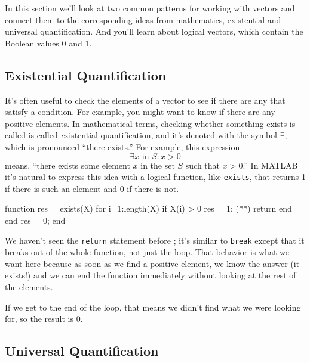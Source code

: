 In this section we'll look at two common patterns for working with vectors and connect them to the corresponding ideas from mathematics, existential and universal quantification.  And you'll learn about logical vectors, which contain the Boolean values 0 and 1. 

\subsection{Existential Quantification}


It's often useful to check the elements of a vector to see if there
are any that satisfy a condition.  For example, you might want to
know if there are any positive elements.  In mathematical terms, checking whether something exists is called is called {\emph existential quantification}, and it's denoted with
the symbol $\exists$, which is pronounced ``there exists.''  For example,
this expression
%
\[ \exists x \mbox{~in~} S: x>0  \]
%
means, ``there exists some element $x$ in the set $S$ such that
$x>0$.''  In MATLAB it's natural to express this idea with a logical
function, like {\tt exists}, that returns 1 if there is such an
element and 0 if there is not.

\begin{code}
function res = exists(X)
    for i=1:length(X)
        if X(i) > 0
            res = 1;
(**)            return
        end
    end
    res = 0;
end
\end{code}

We haven't seen the {\tt return} statement before ; it's similar
to {\tt break} except that it breaks out of the whole function, not
just the loop.  That behavior is what we want here because as soon
as we find a positive element, we know the answer (it exists!) and
we can end the function immediately without looking at the rest
of the elements.


If we get to the end of the loop, that means we didn't find what
we were looking for, so the result is 0.

\subsection{Universal Quantification}


